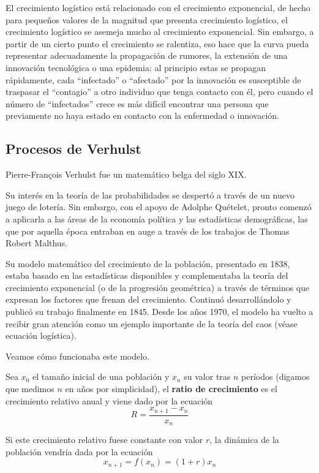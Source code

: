 El crecimiento logístico está relacionado con el crecimiento exponencial, de hecho para pequeños valores de la magnitud que presenta crecimiento logístico, el crecimiento logístico se asemeja mucho al crecimiento exponencial. Sin embargo, a partir de un cierto punto el crecimiento se ralentiza, eso hace que la curva pueda representar adecuadamente la propagación de rumores, la extensión de una innovación tecnológica o una epidemia: al principio estas se propagan rápidamente, cada ``infectado'' o ``afectado'' por la innovación es susceptible de traspasar el ``contagio'' a otro individuo que tenga contacto con él, pero cuando el número de ``infectados'' crece es más difícil encontrar una persona que previamente no haya estado en contacto con la enfermedad o innovación.

\subsection{Procesos de Verhulst}
\begin{definition}
Pierre-François Verhulst fue un matemático belga del siglo XIX.

Su interés en la teoría de las probabilidades se despertó a través de un nuevo juego de lotería. Sin embargo, con el apoyo de Adolphe Quételet, pronto comenzó a aplicarla a las áreas de la economía política y las estadísticas demográficas, las que por aquella época entraban en auge a través de los trabajos de Thomas Robert Malthus.

Su modelo matemático del crecimiento de la población, presentado en 1838, estaba basado en las estadísticas disponibles y complementaba la teoría del crecimiento exponencial (o de la progresión geométrica) a través de términos que expresan los factores que frenan del crecimiento. Continuó desarrollándolo y publicó su trabajo finalmente en 1845. Desde los años 1970, el modelo ha vuelto a recibir gran atención como un ejemplo importante de la teoría del caos (véase ecuación logística).
\end{definition}

Veamos cómo funcionaba este modelo.

Sea $x_0$ el tamaño inicial de una población y $x_n$ su valor tras $n$ períodos (digamos que medimos $n$ en años por simplicidad), el \textbf{ratio de crecimiento} es el crecimiento relativo anual y viene dado por la ecuación
\[R=\frac{x_{n+1}-x_n}{x_n} \]

Si este crecimiento relativo fuese constante con valor $r$, la dinámica de la población vendría dada por la ecuación
\[x_{n+1} = f(x_n) = (1+r)x_n\]

